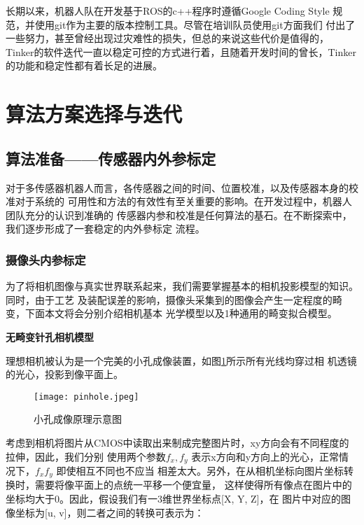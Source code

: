 长期以来，机器人队在开发基于ROS的c++程序时遵循Google Coding Style
规范，并使用git作为主要的版本控制工具。尽管在培训队员使用git方面我们
付出了一些努力，甚至曾经出现过灾难性的损失，但总的来说这些代价是值得的，
Tinker的软件迭代一直以稳定可控的方式进行着，且随着开发时间的曾长，Tinker
的功能和稳定性都有着长足的进展。

\section{算法方案选择与迭代}

\subsection{算法准备——传感器内外参标定}

对于多传感器机器人而言，各传感器之间的时间、位置校准，以及传感器本身的校准对于系统的
可用性和方法的有效性有至关重要的影响。在开发过程中，机器人团队充分的认识到准确的
传感器内参和校准是任何算法的基石。在不断探索中，我们逐步形成了一套稳定的内外參标定
流程。

\subsubsection{摄像头内参标定}
\label{subsec:cam_intrinsic}

为了将相机图像与真实世界联系起来，我们需要掌握基本的相机投影模型的知识。同时，由于工艺
及装配误差的影响，摄像头采集到的图像会产生一定程度的畸变，下面本文将会分别介绍相机基本
光学模型以及1种通用的畸变拟合模型。

\textbf{无畸变针孔相机模型}

理想相机被认为是一个完美的小孔成像装置，如图\ref{fig:pinhole}所示所有光线均穿过相
机透镜的光心，投影到像平面上。

\begin{figure}[h] %
  \centering
  \texttt{[image: pinhole.jpeg]}
  \caption{小孔成像原理示意图}
  \label{fig:pinhole}
\end{figure}

考虑到相机将图片从CMOS中读取出来制成完整图片时，xy方向会有不同程度的拉伸，因此，我们分别
使用两个参数$f_x, f_y$ 表示x方向和y方向上的光心，正常情况下，$f_x f_y$ 即使相互不同也不应当
相差太大。另外，在从相机坐标向图片坐标转换时，需要将像平面上的点统一平移一个便宜量，
这样使得所有像点在图片中的坐标均大于0。因此，假设我们有一3维世界坐标点[X, Y, Z]，在
图片中对应的图像坐标为[u, v]，则二者之间的转换可表示为：

